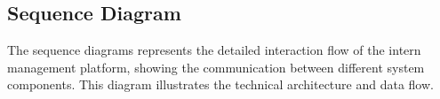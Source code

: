 \subsection{Sequence Diagram}

\noindent
The sequence diagrams represents the detailed interaction flow of the intern management platform, showing the communication between different system components. This diagram illustrates the technical architecture and data flow.



\begin{figure}[H]
    \centering
\end{figure}

